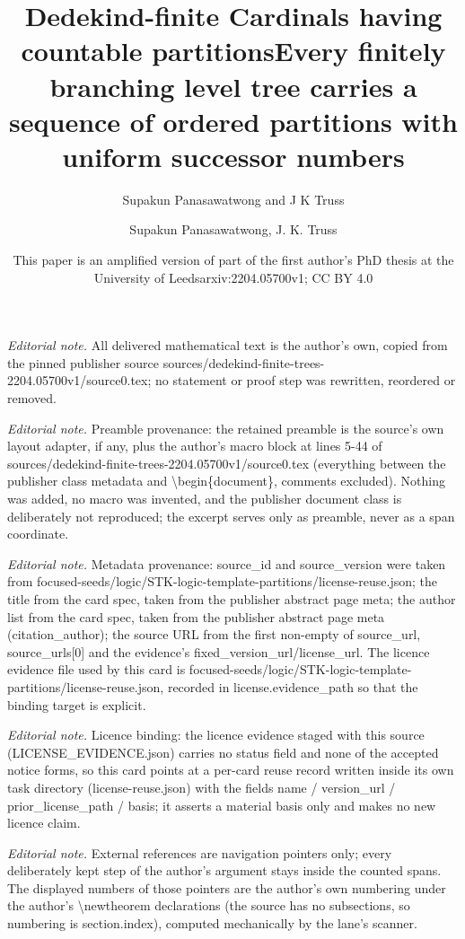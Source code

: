 \documentclass[10pt,a4paper]{amsart}
\title{Dedekind-finite Cardinals having countable partitions}
\author{Supakun Panasawatwong and J K Truss}
\date{This paper is an amplified version of part of the first author's PhD thesis at the University of Leeds}%
\title{Every finitely branching level tree carries a sequence of ordered partitions with uniform successor numbers}
\author{Supakun Panasawatwong, J. K. Truss}
\date{arxiv:2204.05700v1; CC BY 4.0}
\begin{document}
\maketitle
\noindent\textit{Editorial note.} All delivered mathematical text is the author's own, copied from the pinned publisher source sources/dedekind-finite-trees-2204.05700v1/source0.tex; no statement or proof step was rewritten, reordered or removed.\par\medskip
\noindent\textit{Editorial note.} Preamble provenance: the retained preamble is the source's own layout adapter, if any, plus the author's macro block at lines 5-44 of sources/dedekind-finite-trees-2204.05700v1/source0.tex (everything between the publisher class metadata and \textbackslash{}begin\{document\}, comments excluded). Nothing was added, no macro was invented, and the publisher document class is deliberately not reproduced; the excerpt serves only as preamble, never as a span coordinate.\par\medskip
\noindent\textit{Editorial note.} Metadata provenance: source\_id and source\_version were taken from focused-seeds/logic/STK-logic-template-partitions/license-reuse.json; the title from the card spec, taken from the publisher abstract page meta; the author list from the card spec, taken from the publisher abstract page meta (citation\_author); the source URL from the first non-empty of source\_url, source\_urls[0] and the evidence's fixed\_version\_url/license\_url. The licence evidence file used by this card is focused-seeds/logic/STK-logic-template-partitions/license-reuse.json, recorded in license.evidence\_path so that the binding target is explicit.\par\medskip
\noindent\textit{Editorial note.} Licence binding: the licence evidence staged with this source (LICENSE\_EVIDENCE.json) carries no status field and none of the accepted notice forms, so this card points at a per-card reuse record written inside its own task directory (license-reuse.json) with the fields name / version\_url / prior\_license\_path / basis; it asserts a material basis only and makes no new licence claim.\par\medskip
\noindent\textit{Editorial note.} External references are navigation pointers only; every deliberately kept step of the author's argument stays inside the counted spans. The displayed numbers of those pointers are the author's own numbering under the author's \textbackslash{}newtheorem declarations (the source has no subsections, so numbering is section.index), computed mechanically by the lane's scanner.\par\medskip
\end{document}
